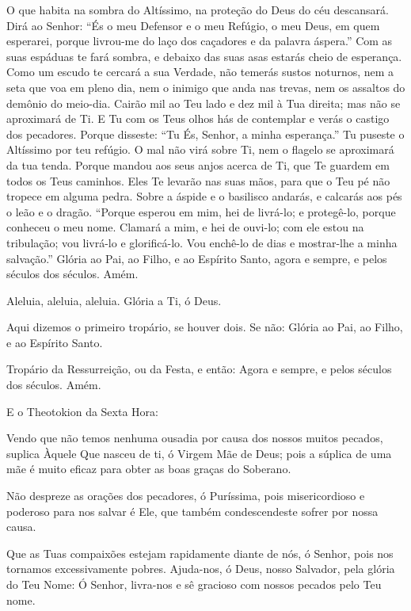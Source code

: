\documentclass{subfiles}
\begin{document}
O que habita na sombra do Altíssimo, na proteção do Deus do céu
descansará. Dirá ao Senhor: “És o meu Defensor e o meu Refúgio, o meu Deus,
em quem esperarei, porque livrou-me do laço dos caçadores e da palavra
áspera.” Com as suas espáduas te fará sombra, e debaixo das suas asas estarás
cheio de esperança. Como um escudo te cercará a sua Verdade, não temerás
sustos noturnos, nem a seta que voa em pleno dia, nem o inimigo que anda
nas trevas, nem os assaltos do demônio do meio-dia. Cairão mil ao Teu lado e
dez mil à Tua direita; mas não se aproximará de Ti. E Tu com os Teus olhos hás
de contemplar e verás o castigo dos pecadores. Porque disseste: “Tu És,
Senhor, a minha esperança.” Tu puseste o Altíssimo por teu refúgio. O mal não
virá sobre Ti, nem o flagelo se aproximará da tua tenda. Porque mandou aos
seus anjos acerca de Ti, que Te guardem em todos os Teus caminhos. Eles Te
levarão nas suas mãos, para que o Teu pé não tropece em alguma pedra. Sobre
a áspide e o basilisco andarás, e calcarás aos pés o leão e o dragão. “Porque
esperou em mim, hei de livrá-lo; e protegê-lo, porque conheceu o meu nome.
Clamará a mim, e hei de ouvi-lo; com ele estou na tribulação; vou livrá-lo e
glorificá-lo. Vou enchê-lo de dias e mostrar-lhe a minha salvação.”
Glória ao Pai, ao Filho, e ao Espírito Santo, agora e sempre, e pelos
séculos dos séculos. Amém.

Aleluia, aleluia, aleluia. Glória a Ti, ó Deus. \thrice{}

\mercy{} \thrice{}

Aqui dizemos o primeiro tropário, se houver dois. Se não: Glória ao Pai,
ao Filho, e ao Espírito Santo.

Tropário da Ressurreição, ou da Festa, e então: Agora e sempre, e pelos
séculos dos séculos. Amém.

E o Theotokion da Sexta Hora:

Vendo que não temos nenhuma ousadia por causa dos nossos muitos pecados, suplica
Àquele Que nasceu de ti, ó Virgem Mãe de Deus; pois a súplica de uma mãe é muito
eficaz para obter as boas graças do Soberano.

Não despreze as orações dos pecadores, ó Puríssima, pois misericordioso e
poderoso para nos salvar é Ele, que também condescendeste sofrer por nossa
causa.

Que as Tuas compaixões estejam rapidamente diante de nós, ó Senhor, pois nos
tornamos excessivamente pobres. Ajuda-nos, ó Deus, nosso Salvador, pela glória
do Teu Nome: Ó Senhor, livra-nos e sê gracioso com nossos pecados pelo Teu nome.
\end{document}
